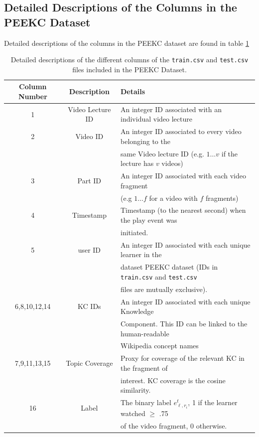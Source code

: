 \documentclass[letterpaper]{article} %
\begin{document}
\newpage
\subsection{Detailed Descriptions of the Columns in the PEEKC Dataset}

Detailed descriptions of the columns in the PEEKC dataset are found in table \ref{tab:features}
\begin{table}[h] \small
\caption{Detailed descriptions of the different columns of the \texttt{train.csv} and \texttt{test.csv} files included in the PEEKC Dataset.}
\label{tab:features}
\centering 
\begin{tabular}{ccl}
\hline
Column Number & Description & Details \\
\hline
1 & Video Lecture ID & An integer ID associated with an individual video lecture \\
2 & Video ID & An integer ID associated to every video belonging to the\\
& & same Video lecture ID (e.g. $1\dots v$ if the lecture has $v$ videos) \\
3 & Part ID & An integer ID associated with each video fragment \\
& & (e.g $1 \dots f$ for a video with $f$ fragments) \\
4 & Timestamp & Timestamp (to the nearest second) when the play event was \\
& &  initiated. \\
5 & user ID & An integer ID associated with each unique learner in the \\
& & dataset PEEKC dataset (IDs in \texttt{train.csv} and \texttt{test.csv} \\ 
& & files are mutually exclusive). \\
6,8,10,12,14 & KC IDs & An integer ID associated with each unique Knowledge \\
& & Component. This ID can be linked to the human-readable   \\
& & Wikipedia concept names \\
7,9,11,13,15 & Topic Coverage & Proxy for coverage of the relevant KC in the fragment of  \\ 
& & interest. KC coverage is the cosine similarity. \\
16 & Label & The binary label $e^t_{\ell,r_i}$, 1 if the learner watched $\geq$ .75 \\
& & of the video  fragment, 0 otherwise.\\
\hline
\end{tabular}
\end{table}
\end{document}
